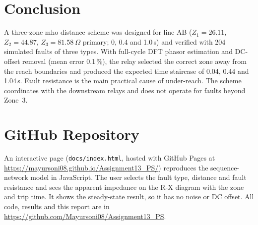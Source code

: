 \documentclass[11pt,a4paper]{article}
\newcommand{\RepoURL}{https://github.com/Mayursoni08/Assignment13_PS}
\newcommand{\DemoURL}{https://mayursoni08.github.io/Assignment13_PS/}
\begin{document}
\section{Conclusion}
A three-zone mho distance scheme was designed for line AB ($Z_1=26.11$, $Z_2=44.87$, $Z_3=81.58~\Omega$ primary; 0, 0.4 and 1.0\,s) and verified with 204 simulated faults of three types. With full-cycle DFT phasor estimation and DC-offset removal (mean error 0.1\,\%), the relay selected the correct zone away from the reach boundaries and produced the expected time staircase of 0.04, 0.44 and 1.04\,s. Fault resistance is the main practical cause of under-reach. The scheme coordinates with the downstream relays and does not operate for faults beyond Zone~3.

\section{GitHub Repository}
An interactive page (\texttt{docs/index.html}, hosted with GitHub Pages at \url{\DemoURL}) reproduces the sequence-network model in JavaScript. The user selects the fault type, distance and fault resistance and sees the apparent impedance on the R-X diagram with the zone and trip time. It shows the steady-state result, so it has no noise or DC offset. All code, results and this report are in \url{\RepoURL}.
\end{document}

